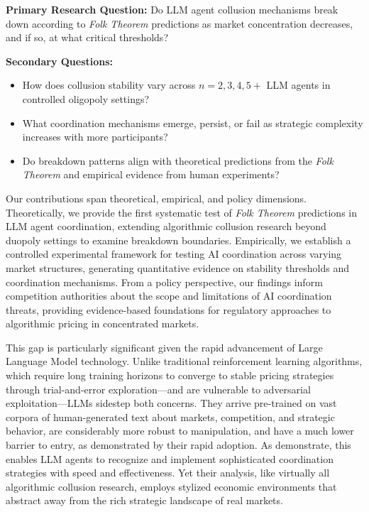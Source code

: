 \textbf{Primary Research Question:} Do LLM agent collusion mechanisms break down according to \emph{Folk Theorem} predictions as market concentration decreases, and if so, at what critical thresholds?

\textbf{Secondary Questions:}
\begin{itemize}
    \item How does collusion stability vary across $n = 2, 3, 4, 5+$ LLM agents in controlled oligopoly settings?
    \item What coordination mechanisms emerge, persist, or fail as strategic complexity increases with more participants?
    \item Do breakdown patterns align with theoretical predictions from the \emph{Folk Theorem} and empirical evidence from human experiments?
\end{itemize}

Our contributions span theoretical, empirical, and policy dimensions. Theoretically, we provide the first systematic test of \emph{Folk Theorem} predictions in LLM agent coordination, extending algorithmic collusion research beyond duopoly settings to examine breakdown boundaries. Empirically, we establish a controlled experimental framework for testing AI coordination across varying market structures, generating quantitative evidence on stability thresholds and coordination mechanisms. From a policy perspective, our findings inform competition authorities about the scope and limitations of AI coordination threats, providing evidence-based foundations for regulatory approaches to algorithmic pricing in concentrated markets.

This gap is particularly significant given the rapid advancement of Large Language Model technology. Unlike traditional reinforcement learning algorithms, which require long training horizons to converge to stable pricing strategies through trial-and-error exploration—and are vulnerable to adversarial exploitation—LLMs sidestep both concerns. They arrive pre-trained on vast corpora of human-generated text about markets, competition, and strategic behavior, are considerably more robust to manipulation, and have a much lower barrier to entry, as demonstrated by their rapid adoption. As \textcite{fish_algorithmic_2025} demonstrate, this enables LLM agents to recognize and implement sophisticated coordination strategies with speed and effectiveness. Yet their analysis, like virtually all algorithmic collusion research, employs stylized economic environments that abstract away from the rich strategic landscape of real markets.

